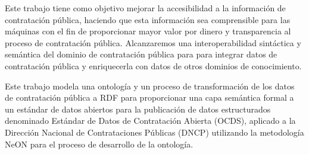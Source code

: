 \begin{resuingles}

Este trabajo tiene como objetivo mejorar la accesibilidad a la información de contratación pública, haciendo que esta información sea comprensible para las máquinas con el fin de proporcionar mayor valor por dinero y transparencia al proceso de contratación pública. Alcanzaremos una interoperabilidad sintáctica y semántica del dominio de contratación pública para para integrar datos de contratación pública y enriquecerla con datos de otros dominios de conocimiento.

Este trabajo modela una ontología y un proceso de transformación de los datos de contratación pública a RDF para proporcionar una capa semántica formal a un estándar de datos abiertos para la publicación de datos estructurados denominado Estándar de Datos de Contratación Abierta (OCDS), aplicado a la Dirección Nacional de Contrataciones Públicas (DNCP) utilizando la metodología NeON para el proceso de desarrollo de la ontología.

\end{resuingles}


